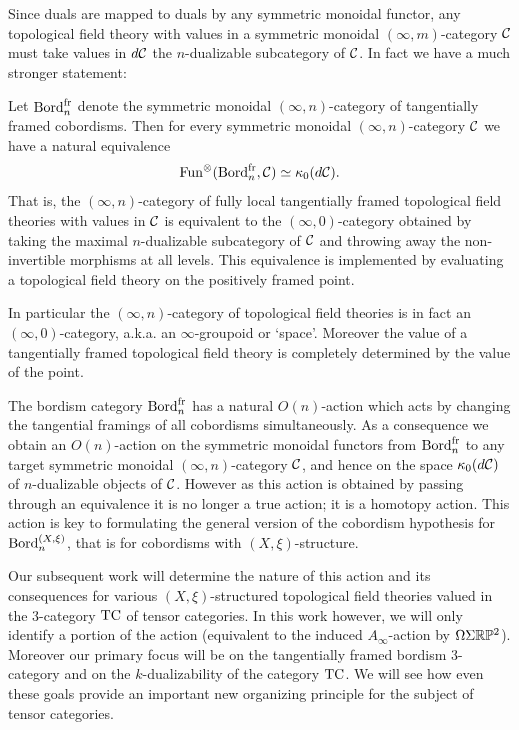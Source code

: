 \documentclass{amsart}
\begin{document}
Since duals are mapped to duals by any symmetric monoidal functor, any topological field theory with values in a symmetric monoidal $(\infty,m)$-category $\mathcal C$ must take values in $d\mathcal C$ the $n$-dualizable subcategory of $\mathcal C$. In fact we have a much stronger statement:

\begin{theorem}
	Let $\mathrm{Bord}^\mathrm{fr}_n$ denote the symmetric monoidal $(\infty,n)$-category of tangentially framed cobordisms. Then for every symmetric monoidal $(\infty,n)$-category $\mathcal C$ we have a natural equivalence
	\begin{equation*}
		\operatorname{Fun}^\otimes(\mathrm{Bord}^\mathrm{fr}_n, \mathcal C) \simeq \kappa_0 (d\mathcal C).
	\end{equation*} 
	That is, the $(\infty,n)$-category of fully local tangentially framed topological field theories with values in $\mathcal C$ is equivalent to the $(\infty,0)$-category obtained by taking the maximal $n$-dualizable subcategory of $\mathcal C$ and throwing away the non-invertible morphisms at all levels. This equivalence is implemented by evaluating a topological field theory on the positively framed point. 
\end{theorem}

\noindent In particular the $(\infty,n)$-category of topological field theories is in fact an $(\infty,0)$-category, a.k.a. an $\infty$-groupoid or `space'. Moreover the value of a tangentially framed topological field theory is completely determined by the value of the point. 

The bordism category $\mathrm{Bord}^\mathrm{fr}_n$ has a natural $O(n)$-action which acts by changing the tangential framings of all cobordisms simultaneously. As a consequence we obtain an $O(n)$-action on the symmetric monoidal functors from $\mathrm{Bord}^\mathrm{fr}_n$ to any target symmetric monoidal $(\infty,n)$-category $\mathcal C$, and hence on the space $\kappa_0 (d\mathcal C)$ of $n$-dualizable objects of $\mathcal C$. However as this action is obtained by passing through an equivalence it is no longer a true action; it is a homotopy action. This action is key to formulating the general version of the cobordism hypothesis for $\mathrm{Bord}_n^{(X,\xi)}$, that is for cobordisms with $(X,\xi)$-structure. 

Our subsequent work will determine the nature of this action and its consequences for various $(X,\xi)$-structured topological field theories valued in the 3-category $\mathrm{TC}$ of tensor categories. In this work however, we will only identify a portion of the action (equivalent to the induced $A_\infty$-action by $\Omega\Sigma\mathbb R\mathbb P^2$). Moreover our primary focus will be on the tangentially framed bordism 3-category and on the $k$-dualizability of the category $\mathrm{TC}$. We will see how even these goals provide an important new organizing principle for the subject of tensor categories.   
\end{document}
